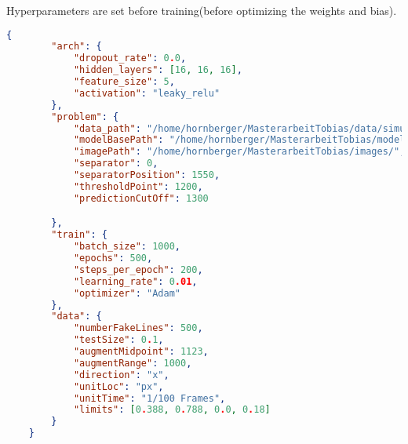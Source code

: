 Hyperparameters are set before training(before optimizing the weights and bias).

\noindent\begin{minipage}{\textwidth}
\begin{lstlisting}[language=json,firstnumber=1, caption={Beispiel eines Hyperparameter Files in JSON}, captionpos=b, label=lst-hyperparam]
    {
        "arch": {
            "dropout_rate": 0.0,
            "hidden_layers": [16, 16, 16],
            "feature_size": 5,
            "activation": "leaky_relu"
        },
        "problem": {
            "data_path": "/home/hornberger/MasterarbeitTobias/data/simulated/SpheresDownsampled",
            "modelBasePath": "/home/hornberger/MasterarbeitTobias/models/simulated/",
            "imagePath": "/home/hornberger/MasterarbeitTobias/images/",
            "separator": 0,
            "separatorPosition": 1550,
            "thresholdPoint": 1200,
            "predictionCutOff": 1300

        },
        "train": {
            "batch_size": 1000,
            "epochs": 500,
            "steps_per_epoch": 200,
            "learning_rate": 0.01,
            "optimizer": "Adam"
        },
        "data": {
            "numberFakeLines": 500,
            "testSize": 0.1,
            "augmentMidpoint": 1123,
            "augmentRange": 1000,
            "direction": "x",
            "unitLoc": "px",
            "unitTime": "1/100 Frames",    
            "limits": [0.388, 0.788, 0.0, 0.18]
        }
    }

    
\end{lstlisting}
\end{minipage}
    
